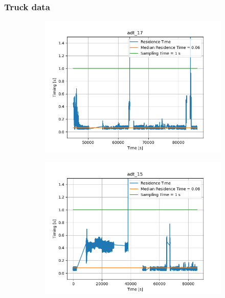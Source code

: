 \subsubsection{Truck data}
\begin{figure}[H]
    \begin{minipage}{0.49\textwidth}
        \begin{figure}[H]
            \includegraphics[width=\textwidth]{figs/res_time/adt_17_timing_stuff.png}
        \end{figure}
    \end{minipage}
    \begin{minipage}{0.49\textwidth}
        \begin{figure}[H]
            \includegraphics[width=\textwidth]{figs/res_time/adt_15_timing_stuff.png}

\end{figure}
\end{minipage}
\end{figure}
